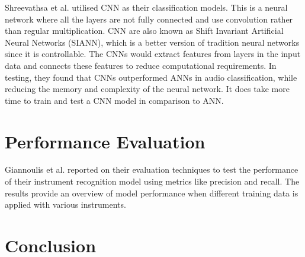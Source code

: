 Shreevathsa et al. utilised CNN as their classification models. This is a neural network where all the layers are not fully connected and use convolution rather than regular multiplication. CNN are also known as Shift Invariant Artificial Neural Networks (SIANN), which is a better version of tradition neural networks since it is controllable. The CNNs would extract features from layers in the input data and connects these features to reduce computational requirements. In testing, they found that CNNs outperformed ANNs in audio classification, while reducing the memory and complexity of the neural network. It does take more time to train and test a CNN model in comparison to ANN. 

\section{Performance Evaluation}

Giannoulis et al. reported on their evaluation techniques to test the performance of their instrument recognition model using metrics like precision and recall. The results provide an overview of model performance when different training data is applied with various instruments. 

\section{Conclusion}

% 
% 

